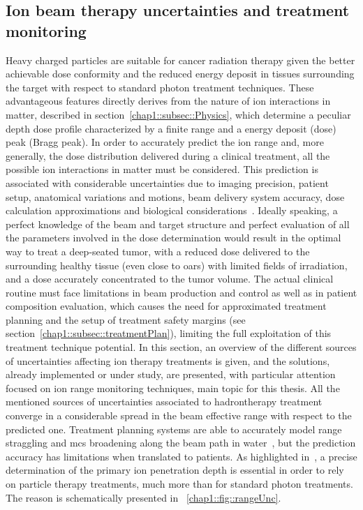 \subsection{Ion beam therapy uncertainties and treatment monitoring}\label{chap1::subsec::uncertainty}
Heavy charged particles are suitable for cancer radiation therapy given the better achievable dose conformity and the reduced energy deposit in tissues surrounding the target with respect to standard photon treatment techniques. These advantageous features directly derives from the nature of ion interactions in matter, described in section~\ref{chap1::subsec::Physics}, which determine a peculiar depth dose profile characterized by a finite range and a energy deposit (dose) peak (Bragg peak). In order to accurately predict the ion range and, more generally, the dose distribution delivered during a clinical treatment, all the possible ion interactions in matter must be considered. This prediction is associated with considerable uncertainties due to imaging precision, patient setup, anatomical variations and motions, beam delivery system accuracy, dose calculation approximations and biological considerations~\parencite{Paganetti2012}. Ideally speaking, a perfect knowledge of the beam and target structure and perfect evaluation of all the parameters involved in the dose determination would result in the optimal way to treat a deep-seated tumor, with a reduced dose delivered to the surrounding healthy tissue (even close to \glspl{oar}) with limited fields of irradiation, and a dose accurately concentrated to the tumor volume. The actual clinical routine must face limitations in beam production and control as well as in patient composition evaluation, which causes the need for approximated treatment planning and the setup of treatment safety margins (see section~\ref{chap1::subsec::treatmentPlan}), limiting the full exploitation of this treatment technique potential. In this section, an overview of the different sources of uncertainties affecting ion therapy treatments is given, and the solutions, already implemented or under study, are presented, with particular attention focused on ion range monitoring techniques, main topic for this thesis.
All the mentioned sources of uncertainties associated to hadrontherapy treatment converge in a considerable spread in the beam effective range with respect to the predicted one. Treatment planning systems are able to accurately model range straggling and \gls{mcs} broadening along the beam path in water~\parencite{Hong1996}, but the prediction accuracy has limitations when translated to patients. As highlighted in~\cite{Schlegel2008}, a precise determination of the primary ion penetration depth is essential in order to rely on particle therapy treatments, much more than for standard photon treatments. The reason is schematically presented in \figurename~\ref{chap1::fig::rangeUnc}.

